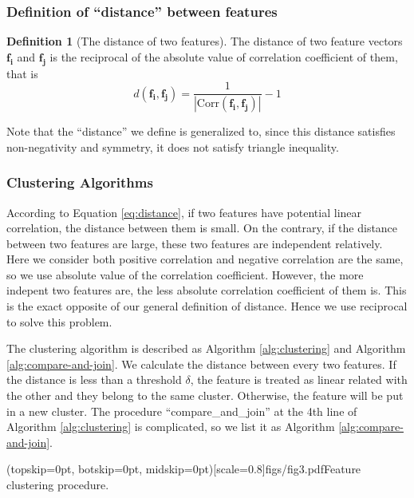 \documentclass{ieeeaccess}
\theoremstyle{definition}
\newtheorem{defn}{Definition}
\begin{document}
\subsubsection{Definition of ``distance'' between features}

\begin{defn}[The distance of two features]
    \label{def:distance}
    The distance of two feature vectors $\bm{f_i}$ and $\bm{f_j}$ is the reciprocal of the absolute value of correlation coefficient of them, that is
    \begin{equation}
        \label{eq:distance}
        d(\bm{f_i}, \bm{f_j}) = \frac{1}{|\text{Corr}(\bm{f_i}, \bm{f_j})|}-1
    \end{equation}
    \end{defn}

Note that the ``distance'' we define is generalized to, since this distance satisfies non-negativity and symmetry, it does not satisfy triangle inequality. 

\subsubsection{Clustering Algorithms}

According to Equation \ref{eq:distance}, if two features have potential linear correlation, the distance between them is small. On the contrary, if the distance between two features are large, these two features are independent relatively. Here we consider both positive correlation and negative correlation are the same, so we use absolute value of the correlation coefficient. However, the more indepent two features are, the less absolute correlation coefficient of them is. This is the exact opposite of our general definition of distance. Hence we use reciprocal to solve this problem.

The clustering algorithm is described as Algorithm \ref{alg:clustering} and Algorithm \ref{alg:compare-and-join}. We calculate the distance between every two features. If the distance is less than a threshold $\delta$, the feature is treated as linear related with the other and they belong to the same cluster. Otherwise, the feature will be put in a new cluster. The procedure ``compare\_and\_join'' at the 4th line of Algorithm \ref{alg:clustering} is complicated, so we list it as Algorithm \ref{alg:compare-and-join}.


\Figure[!htpb](topskip=0pt, botskip=0pt, midskip=0pt)[scale=0.8]{figs/fig3.pdf}{Feature clustering procedure. \label{fig:feature-clustering}}
\end{document}

